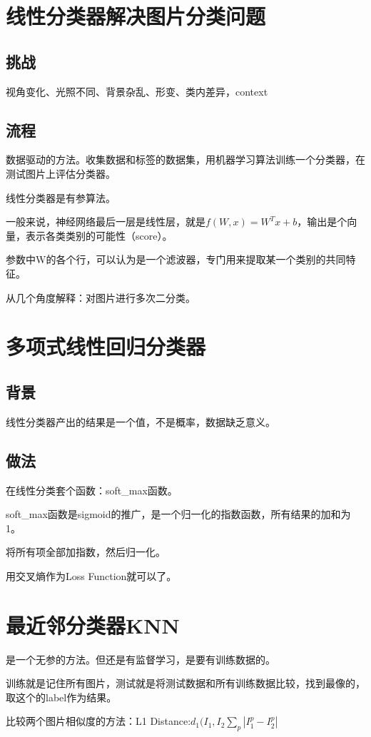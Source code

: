 \documentclass[UTF8]{ctexart}
\begin{document}
\section{线性分类器解决图片分类问题}
\subsection{挑战}
视角变化、光照不同、背景杂乱、形变、类内差异，context

\subsection{流程}
数据驱动的方法。收集数据和标签的数据集，用机器学习算法训练一个分类器，在测试图片上评估分类器。

线性分类器是有参算法。

一般来说，神经网络最后一层是线性层，就是$f(W,x)=W^Tx+b$，输出是个向量，表示各类类别的可能性（score）。

参数中W的各个行，可以认为是一个滤波器，专门用来提取某一个类别的共同特征。

从几个角度解释：对图片进行多次二分类。

\section{多项式线性回归分类器}
\subsection{背景}
线性分类器产出的结果是一个值，不是概率，数据缺乏意义。

\subsection{做法}
在线性分类套个函数：soft_max函数。

soft_max函数是sigmoid的推广，是一个归一化的指数函数，所有结果的加和为1。

将所有项全部加指数，然后归一化。

用交叉熵作为Loss Function就可以了。

\section{最近邻分类器KNN}
是一个无参的方法。但还是有监督学习，是要有训练数据的。

训练就是记住所有图片，测试就是将测试数据和所有训练数据比较，找到最像的，取这个的label作为结果。

比较两个图片相似度的方法：L1 Distance:$d_1(I_1,I_2\sum_p|I_1^p-I_2^p|$
\end{document}

